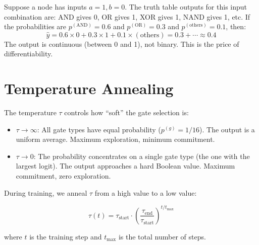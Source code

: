 \begin{example}
Suppose a node has inputs $a = 1, b = 0$. The truth table outputs for
this input combination are: AND gives 0, OR gives 1, XOR gives 1,
NAND gives 1, etc. If the probabilities are
$p^{(\text{AND})} = 0.6$ and $p^{(\text{OR})} = 0.3$ and
$p^{(\text{others})} = 0.1$, then:
\[
  \hat{y} = 0.6 \times 0 + 0.3 \times 1 + 0.1 \times (\text{others})
  = 0.3 + \cdots \approx 0.4
\]
The output is continuous (between 0 and 1), not binary. This is the
price of differentiability.
\end{example}


\section{Temperature Annealing}
\label{sec:annealing}

The temperature $\tau$ controls how ``soft'' the gate selection is:

\begin{itemize}
  \item $\tau \to \infty$: All gate types have equal probability
    ($p^{(g)} = 1/16$). The output is a uniform average. Maximum
    exploration, minimum commitment.
  \item $\tau \to 0$: The probability concentrates on a single gate
    type (the one with the largest logit). The output approaches a
    hard Boolean value. Maximum commitment, zero exploration.
\end{itemize}

During training, we anneal $\tau$ from a high value to a low value:

\begin{equation}
  \tau(t) = \tau_{\text{start}} \cdot
    \left(\frac{\tau_{\text{end}}}{\tau_{\text{start}}}\right)^{t / t_{\max}}
  \label{eq:anneal}
\end{equation}

where $t$ is the training step and $t_{\max}$ is the total number of
steps.

